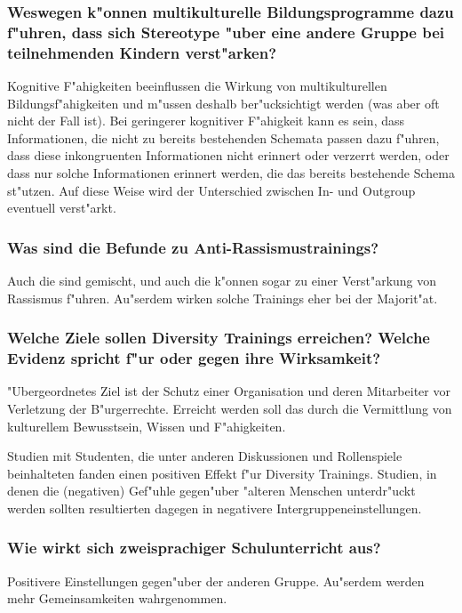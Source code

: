 \subsubsection{Weswegen k"onnen multikulturelle Bildungsprogramme dazu f"uhren, dass sich Stereotype "uber eine andere Gruppe bei teilnehmenden Kindern verst"arken?}
Kognitive F"ahigkeiten beeinflussen die Wirkung von multikulturellen Bildungsf"ahigkeiten und m"ussen deshalb ber"ucksichtigt werden (was aber oft nicht der Fall ist). Bei geringerer kognitiver F"ahigkeit kann es sein, dass Informationen, die nicht zu bereits bestehenden Schemata passen dazu f"uhren, dass diese inkongruenten Informationen nicht erinnert oder verzerrt werden, oder dass nur solche Informationen erinnert werden, die das bereits bestehende Schema st"utzen. Auf diese Weise wird der Unterschied zwischen In- und Outgroup eventuell verst"arkt.

\subsubsection{Was sind die Befunde zu Anti-Rassismustrainings?}
Auch die sind gemischt, und auch die k"onnen sogar zu einer Verst"arkung von Rassismus f"uhren. Au"serdem wirken solche Trainings eher bei der Majorit"at.

\subsubsection{Welche Ziele sollen Diversity Trainings erreichen? Welche Evidenz spricht f"ur oder gegen ihre Wirksamkeit?}
"Ubergeordnetes Ziel ist der Schutz einer Organisation und deren Mitarbeiter vor Verletzung der B"urgerrechte. Erreicht werden soll das durch die Vermittlung von kulturellem Bewusstsein, Wissen und F"ahigkeiten.

Studien mit Studenten, die unter anderen Diskussionen und Rollenspiele beinhalteten fanden einen positiven Effekt f"ur Diversity Trainings. Studien, in denen die (negativen) Gef"uhle gegen"uber "alteren Menschen unterdr"uckt werden sollten resultierten dagegen in negativere Intergruppeneinstellungen.

\subsubsection{Wie wirkt sich zweisprachiger Schulunterricht aus?}
Positivere Einstellungen gegen"uber der anderen Gruppe. Au"serdem werden mehr Gemeinsamkeiten wahrgenommen.

